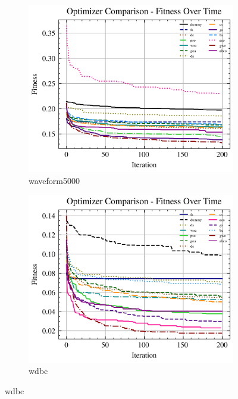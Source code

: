 \begin{figure}[htb]
    \begin{subfigure}[b]{0.45\textwidth}
        \includegraphics[width=\textwidth]{imagenes/fitness_charts/img/binary/waveform5000/optimizers_fitness_svc.png}
        \caption{waveform5000}
        \label{fig:convergencia_waveform5000_svc}
    \end{subfigure}
    \begin{subfigure}[b]{0.45\textwidth}
        \includegraphics[width=\textwidth]{imagenes/fitness_charts/img/binary/wdbc/optimizers_fitness_svc.png}
        \caption{wdbc}
        \label{fig:convergencia_wdbc_svc}
    \end{subfigure}


\end{figure}
